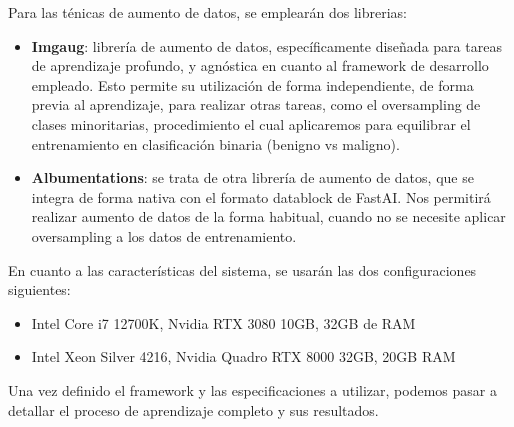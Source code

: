 Para las ténicas de aumento de datos, se emplearán dos librerias:
\begin{itemize}
	\item \textbf{Imgaug}: librería de aumento de datos, específicamente diseñada para tareas de aprendizaje profundo, y agnóstica en cuanto al framework de desarrollo empleado. Esto permite su utilización de forma independiente, de forma previa al aprendizaje, para realizar otras tareas, como el oversampling de clases minoritarias, procedimiento el cual aplicaremos para equilibrar el entrenamiento en clasificación binaria (benigno vs maligno).
	
	 \item \textbf{Albumentations}: se trata de otra librería de aumento de datos, que se integra de forma nativa con el formato datablock de FastAI. Nos permitirá realizar aumento de datos de la forma habitual, cuando no se necesite aplicar oversampling a los datos de entrenamiento.
\end{itemize}

En cuanto a las características del sistema, se usarán las dos configuraciones siguientes:

\begin{itemize}
	\item Intel Core i7 12700K, Nvidia RTX 3080 10GB, 32GB de RAM
	\item Intel Xeon Silver 4216, Nvidia Quadro RTX 8000 32GB, 20GB RAM
\end{itemize}

Una vez definido el framework y las especificaciones a utilizar, podemos pasar a detallar el proceso de aprendizaje completo y sus resultados.

